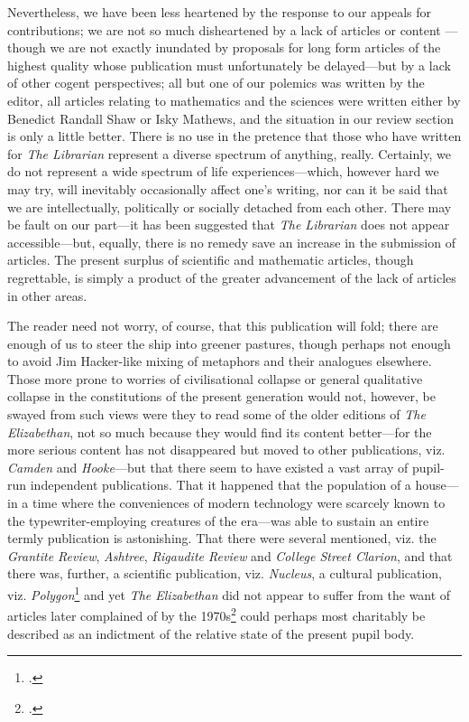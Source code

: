 \begin{multicols}{2}
Nevertheless, we have been less heartened by the response to our appeals for 
contributions; we are not so much disheartened by a lack of articles or content
---though we are not exactly inundated by proposals for long form articles of
the highest quality whose publication must unfortunately be delayed---but by a
lack of other cogent perspectives; all but one of our polemics was written
by the editor, all articles relating to mathematics and the sciences were 
written either by Benedict Randall Shaw or Isky Mathews, and the situation in 
our review section is only a little better. There is no use in the pretence that
those who have written for \textit{The Librarian} represent a diverse spectrum
of anything, really. Certainly, we do not represent a wide spectrum of
life experiences---which, however hard we may try, will inevitably occasionally
affect one's writing, nor can it be said that we are intellectually, politically
or socially detached from each other. There may be fault on our part---it has
been suggested that \textit{The Librarian} does not appear accessible---but, equally, there is no remedy save an increase in the
submission of articles. The present surplus of scientific and mathematic
articles, though regrettable, is simply a product of the greater advancement of
the lack of articles in other areas.

The reader need not worry, of course, that this publication will fold; there 
are enough of us to steer the ship into greener pastures, though perhaps not 
enough to avoid Jim Hacker-like mixing of metaphors and their analogues elsewhere. Those more prone to worries of civilisational collapse or general qualitative collapse in the constitutions of the present generation would not, however, be
swayed from such views were they to read some of the older editions of
\textit{The Elizabethan}, not so much because they would find its content
better---for the more serious content has not disappeared but moved to other
publications, viz. \textit{Camden} and \textit{Hooke}---but that there seem to
have existed a vast array of pupil-run independent publications. That it 
happened that the population of a house---in a time where the conveniences 
of modern technology were scarcely known to the typewriter-employing creatures 
of the era---was able to sustain an entire termly publication is astonishing. 
That there were several mentioned, viz. the \textit{Grantite Review}, 
\textit{Ashtree}, \textit{Rigaudite Review} and \textit{College Street 
	Clarion}, and that there was, further, a scientific publication, viz. 
\textit{Nucleus}, a cultural publication, viz. 
\textit{Polygon}\footcite{magazines} and yet \textit{The Elizabethan} did not 
appear to suffer from the want of articles later complained of by the 
1970s\footcite{elizabethan76} could perhaps most charitably be described as an 
indictment of the relative state of the present pupil body.


\end{multicols}
